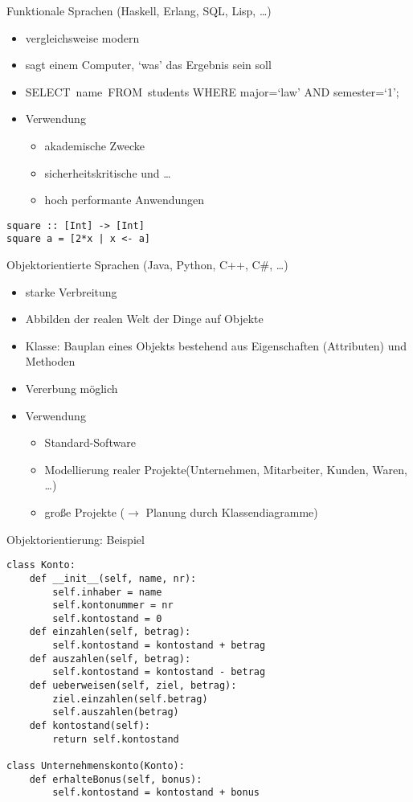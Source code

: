 \begin{frame}[fragile]{Funktionale Sprachen (Haskell, Erlang, SQL, Lisp, \dots)}
    \begin{itemize}
       \item vergleichsweise modern
       \item sagt einem Computer, `was' das Ergebnis sein soll
       \item SELECT name FROM students WHERE major=‘law’ AND semester=‘1’;
       \item Verwendung
        \begin{itemize}
            \item akademische Zwecke
            \item sicherheitskritische und \dots
            \item hoch performante Anwendungen
        \end{itemize}
    \end{itemize}
    \begin{lstlisting}
square :: [Int] -> [Int]
square a = [2*x | x <- a]
    \end{lstlisting}
\end{frame}

\begin{frame}[fragile]{Objektorientierte Sprachen (Java, Python, C++, C\#, \dots)}
    \begin{itemize}
       \item starke Verbreitung
       \item Abbilden der realen Welt der Dinge auf Objekte
       \item Klasse: Bauplan eines Objekts bestehend aus Eigenschaften (Attributen) und Methoden
       \item Vererbung möglich
       \item Verwendung
        \begin{itemize}
            \item Standard-Software
            \item Modellierung realer Projekte(Unternehmen, Mitarbeiter, Kunden, Waren, \dots)
            \item große Projekte ($\rightarrow$ Planung durch Klassendiagramme)
        \end{itemize}
    \end{itemize}
\end{frame}

\begin{frame}[fragile]{Objektorientierung: Beispiel}
    \begin{lstlisting}
class Konto:
    def __init__(self, name, nr):
        self.inhaber = name
        self.kontonummer = nr
        self.kontostand = 0
    def einzahlen(self, betrag):
        self.kontostand = kontostand + betrag
    def auszahlen(self, betrag):
        self.kontostand = kontostand - betrag
    def ueberweisen(self, ziel, betrag): 
        ziel.einzahlen(self.betrag)
        self.auszahlen(betrag)
    def kontostand(self):
        return self.kontostand

class Unternehmenskonto(Konto):
    def erhalteBonus(self, bonus):
        self.kontostand = kontostand + bonus
    \end{lstlisting}
\end{frame}

